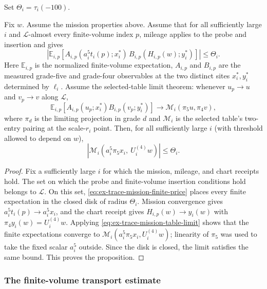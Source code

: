 Set $\Theta_i=\tau_i(-100)$.
\begin{proposition}
\label{prop:ex-trace-mission-price-transfer}
Fix $w$. Assume the mission properties above. Assume that for all
sufficiently large $i$ and $\mathcal L$-almost every finite-volume index
$p$, mileage applies to the probe and insertion and gives
\begin{equation}
 \left|\mathbb E_{i,p}\!\left[
   A_{i,p}(a_i^5t_i(p);x_i^*)\,B_{i,p}(H_{i,p}(w);y_i^*)
                 \right]\right|\leq\Theta_i.
 \label{eq:ex-trace-mission-finite-price}
\end{equation}
Here $\mathbb E_{i,p}$ is the normalized finite-volume expectation,
$A_{i,p}$ and $B_{i,p}$ are the measured grade-five and grade-four
observables at the two distinct sites $x_i^*,y_i^*$ determined by $\ell_i$.
Assume the selected-table limit theorem:
whenever $u_p\to u$ and $v_p\to v$ along $\mathcal L$,
\begin{equation}
 \mathbb E_{i,p}[A_{i,p}(u_p;x_i^*)B_{i,p}(v_p;y_i^*)]
   \longrightarrow \mathcal M_i(\pi_5u,\pi_4v),
 \label{eq:ex-trace-mission-table-limit}
\end{equation}
where $\pi_d$ is the limiting projection in grade $d$ and $\mathcal M_i$
is the selected table's two-entry pairing at the scale-$r_i$ point.
Then, for all sufficiently large $i$ (with threshold allowed to depend on
$w$),
\[
 \left|\mathcal M_i\!\left(a_i^5\pi_5x_i,\ U_i^{(4)}w\right)\right|
      \leq\Theta_i.
\]
\end{proposition}
\begin{proof}
Fix a sufficiently large $i$ for which the mission, mileage, and chart
receipts hold. The set on which the probe and finite-volume insertion
conditions hold belongs to $\mathcal L$. On this set,
\eqref{eq:ex-trace-mission-finite-price} places every finite expectation in
the closed disk of radius $\Theta_i$. Mission convergence gives
$a_i^5t_i(p)\to a_i^5x_i$, and the chart receipt gives
$H_{i,p}(w)\to y_i(w)$ with $\pi_4y_i(w)=U_i^{(4)}w$. Applying
\eqref{eq:ex-trace-mission-table-limit} shows that the finite expectations
converge to $\mathcal M_i(a_i^5\pi_5x_i,U_i^{(4)}w)$; linearity of $\pi_5$
was used to take the fixed scalar $a_i^5$ outside. Since the disk is
closed, the limit satisfies the same bound. This proves the proposition.
\end{proof}

\subsubsection{The finite-volume transport estimate}

